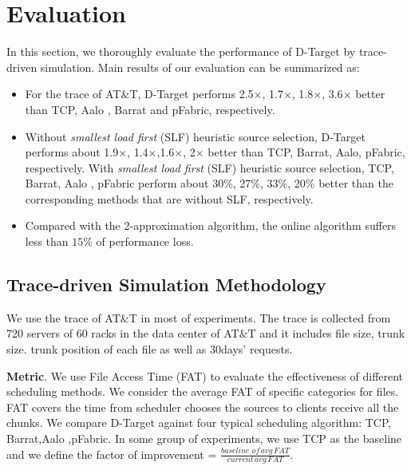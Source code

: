 \documentclass{IEEEtran}
\begin{document}
\section {Evaluation} \label{evaluation}
In this section, we thoroughly evaluate the performance of D-Target by trace-driven simulation. 
Main results of our evaluation can be summarized as:
\begin{itemize}[]

\item For the trace of AT$\&$T, D-Target performs 2.5$\times$, 1.7$\times$, 1.8$\times$, 3.6$\times$ better than TCP, Aalo \cite{chowdhury2015efficient}, Barrat\cite{dogar2014decentralized} and pFabric\cite{pFabric}, respectively.
 
 \item Without  {\em smallest load  first} (SLF) heuristic source selection, D-Target  performs about 1.9$\times$, 1.4$\times$,1.6$\times$, 2$\times$ better than TCP, Barrat,  Aalo, pFabric, respectively. 
With {\em smallest load  first} (SLF) heuristic source selection, TCP,  Barrat\cite{dogar2014decentralized}, Aalo \cite{chowdhury2015efficient}, pFabric\cite{pFabric}
 perform about 30\%, 27\%, 33\%, 20\% better than the corresponding methods that are without SLF, respectively.
\item Compared with the 2-approximation algorithm, the online algorithm suffers less than $15\%$ of performance loss.
\end{itemize}



\subsection{Trace-driven Simulation Methodology}

We use the trace of AT$\&$T in most of experiments.
The trace is collected from 720 servers of 60 racks in the data center of AT$\&$T
and it includes file size, trunk size. trunk position of each file as well as 30days' requests.

\textbf{Metric}.
We use File Access Time (FAT)  to evaluate the effectiveness of different scheduling methods.
We consider the average FAT of specific categories for files. 
FAT covers the time from scheduler chooses the sources to clients receive all the chunks.
We compare D-Target against four typical scheduling algorithm: TCP, Barrat\cite{dogar2014decentralized},Aalo \cite{chowdhury2015efficient},pFabric\cite{pFabric}.
In some group of experiments, we use TCP as the baseline and we define the factor of improvement = $\frac{baseline \, \,  of \,  avg \,  FAT}{current \,   avg \,  FAT}$.
\end{document}

